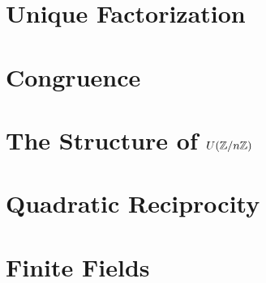 \documentclass{mynotes}
\begin{document}
\tableofcontents
\chapter{Unique Factorization}






\chapter{Congruence}


\chapter{The Structure of $U(\mathbb{Z}/n\mathbb{Z})$}

\chapter{Quadratic Reciprocity}


\chapter{Finite Fields}





\end{document}
